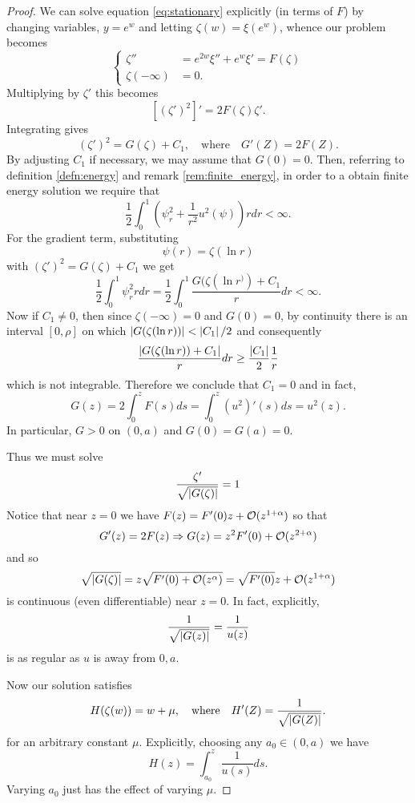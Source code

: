 \documentclass{amsart}
\begin{document}
\begin{proof}
We can solve equation \eqref{eq:stationary} explicitly (in terms of \(F\)) by changing variables, \(y = e^w\) and letting \(\zeta(w) = \xi(e^w)\), whence our problem becomes
\[
\begin{cases}
\zeta'' &= e^{2w} \xi'' + e^w \xi' = F (\zeta) \\
\zeta(-\infty) &= 0.
\end{cases}
\]
Multiplying by \(\zeta'\) this becomes
\[
[(\zeta')^2]' = 2 F (\zeta) \zeta'.
\]
Integrating gives
\[
(\zeta')^2 = G(\zeta) + C_1, \quad \text{where} \quad G'(Z) = 2 F(Z).
\]
By adjusting \(C_1\) if necessary, we may assume that \(G(0) = 0\). Then, referring to definition \ref{defn:energy} and remark \ref{rem:finite_energy}, in order to a obtain finite energy solution we require that
\[
\frac{1}{2} \int_0^1 \left(\psi_r^2 + \frac{1}{r^2} u^2(\psi)\right) r dr < \infty.
\]
For the gradient term, substituting
\[
\psi(r) = \zeta(\ln r)
\]
with \((\zeta')^2 = G(\zeta) + C_1\) we get
\[
\frac{1}{2} \int_0^1 \psi_r^2 r dr  = \frac{1}{2} \int_0^1 \frac{G(\zeta(\ln r^)) + C_1}{r} dr < \infty.
\]
Now if \(C_1 \ne 0\), then since \(\zeta(-\infty) = 0\) and \(G(0) = 0\), by continuity there is an interval \([0, \rho]\) on which \(\left|{G(\zeta(\ln r))}\right| < \left|{C_1}\right|/2\) and consequently
\[
\frac{\left|{G(\zeta(\ln r)) + C_1}\right|}{r} dr \geq \frac{\left|{C_1}\right|}{2} \frac{1}{r}
\]
which is not integrable. Therefore we conclude that \(C_1 = 0\) and in fact,
\begin{equation}
\label{eq:G}
G(z) = 2 \int_0^z F (s) ds = \int_0^z (u^2)' (s) ds = u^2 (z).
\end{equation}
In particular, \(G > 0\) on \((0,a)\) and \(G(0) = G(a) = 0\).

Thus we must solve
\[
\frac{\zeta'}{\sqrt{\left|{G(\zeta)}\right|}} = 1
\]
Notice that near \(z = 0\) we have \(F (z) = F'(0) z + \operatorname{\mathcal{O}}(z^{1+\alpha})\) so that
\[
G'(z) = 2F(z) \Rightarrow G(z) = z^2F'(0) + \operatorname{\mathcal{O}}(z^{2 + \alpha})
\]
and so
\[
\sqrt{\left|{G(\zeta)}\right|} = z \sqrt{F'(0) + \operatorname{\mathcal{O}}(z^{\alpha})} = \sqrt{F'(0)} z + \operatorname{\mathcal{O}}(z^{1 + \alpha})
\]
is continuous (even differentiable) near \(z = 0\). In fact, explicitly,
\[
\frac{1}{\sqrt{\left|{G(z)}\right|}} = \frac{1}{u(z)}
\]
is as regular as \(u\) is away from \(0, a\).

Now our solution satisfies
\[
H (\zeta(w)) = w + \mu, \quad \text{where} \quad H'(Z) = \frac{1}{\sqrt{\left|{G(Z)}\right|}}.
\]
for an arbitrary constant \(\mu\). Explicitly, choosing any \(a_0 \in (0, a)\) we have
\begin{equation}
\label{eq:H}
H(z) = \int_{a_0}^z \frac{1}{u(s)} ds.
\end{equation}
Varying \(a_0\) just has the effect of varying \(\mu\).


\end{proof}
\end{document}
